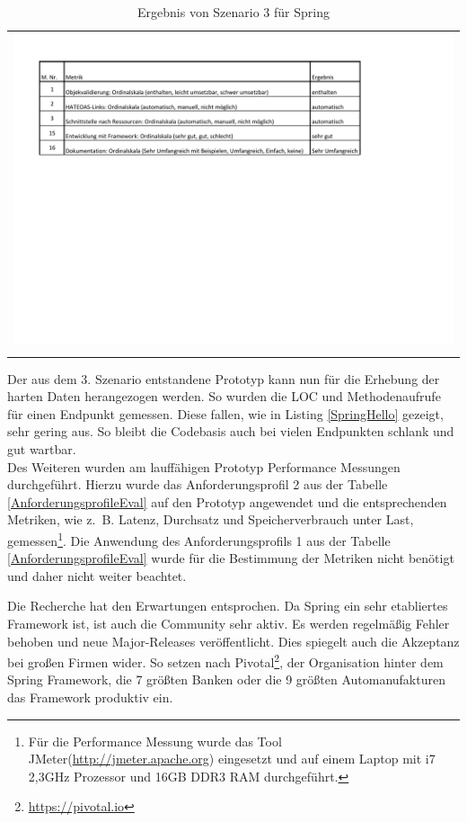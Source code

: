 \begin{longtable}{c}
	\includegraphics[width=\linewidth]{Bilder/Sz3ErgebnisSpring.pdf} \\	
	\caption[Szenario 3 Ergebnis Spring]{Ergebnis von Szenario 3 für Spring}
	\label{Sz3ErgebnisSpring}\\
\end{longtable}
\FloatBarrier

Der aus dem 3. Szenario entstandene Prototyp kann nun für die Erhebung der harten Daten herangezogen werden. So wurden die \ac{LOC} und Methodenaufrufe für einen Endpunkt gemessen. Diese fallen, wie in Listing \ref{SpringHello} gezeigt, sehr gering aus. So bleibt die Codebasis auch bei vielen Endpunkten schlank und gut wartbar.\\
Des Weiteren wurden am lauffähigen Prototyp Performance Messungen durchgeführt. Hierzu wurde das Anforderungsprofil 2 aus der Tabelle \ref{AnforderungsprofileEval} auf den Prototyp angewendet und die entsprechenden Metriken, wie z.~B. Latenz, Durchsatz und Speicherverbrauch unter Last, gemessen\footnote{Für die Performance Messung wurde das Tool JMeter(\url{http://jmeter.apache.org}) eingesetzt und auf einem Laptop mit i7 2,3GHz Prozessor und 16GB DDR3 RAM durchgeführt.}. Die Anwendung des Anforderungsprofils 1 aus der Tabelle \ref{AnforderungsprofileEval} wurde für die Bestimmung der Metriken nicht benötigt und daher nicht weiter beachtet.

Die Recherche hat den Erwartungen entsprochen. Da Spring ein sehr etabliertes Framework ist, ist auch die Community sehr aktiv. Es werden regelmäßig Fehler behoben und neue Major-Releases veröffentlicht. Dies spiegelt auch die Akzeptanz bei großen Firmen wider. So setzen nach Pivotal\footnote{\url{https://pivotal.io}}, der Organisation hinter dem Spring Framework, die 7 größten Banken oder die 9 größten Automanufakturen das Framework produktiv ein.

